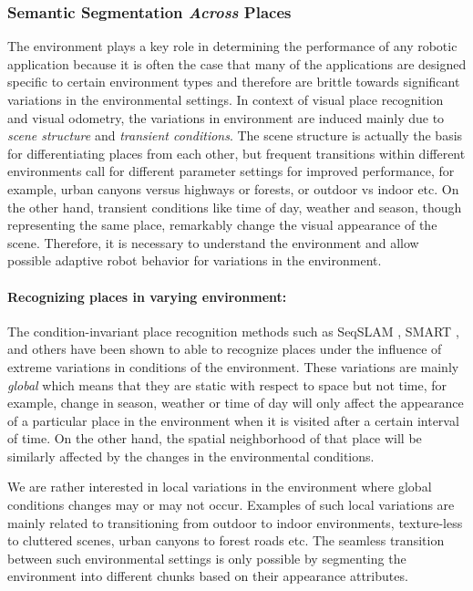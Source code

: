 \documentclass{article}
\begin{document}
\subsubsection{Semantic Segmentation \emph{Across} Places}
The environment plays a key role in determining the performance of any robotic application because it is often the case that many of the applications are designed specific to certain environment types and therefore are brittle towards significant variations in the environmental settings. In context of visual place recognition and visual odometry, the variations in environment are induced mainly due to \emph{scene structure} and \emph{transient conditions}. The scene structure is actually the basis for differentiating places from each other, but frequent transitions within different environments call for different parameter settings for improved performance, for example, urban canyons versus highways or forests, or outdoor vs indoor etc. On the other hand, transient conditions like time of day, weather and season, though representing the same place, remarkably change the visual appearance of the scene. Therefore, it is necessary to understand the environment and allow possible adaptive robot behavior for variations in the environment.

\paragraph{Recognizing places in varying environment:}The condition-invariant place recognition methods such as SeqSLAM \cite{Milford2012}, SMART \cite{Pepperell2014}, and others \cite{Naseer2014,Niko2015,Maddern} have been shown to able to recognize places under the influence of extreme variations in conditions of the environment. These variations are mainly \emph{global} which means that they are static with respect to space but not time, for example, change in season, weather or time of day will only affect the appearance of a particular place in the environment when it is visited after a certain interval of time. On the other hand, the spatial neighborhood of that place will be similarly affected by the changes in the environmental conditions. 

We are rather interested in local variations in the environment where global conditions changes may or may not occur. Examples of such local variations are mainly related to transitioning from outdoor to indoor environments, texture-less to cluttered scenes, urban canyons to forest roads etc. The seamless transition between such environmental settings is only possible by segmenting the environment into different chunks based on their appearance attributes.
\end{document}
